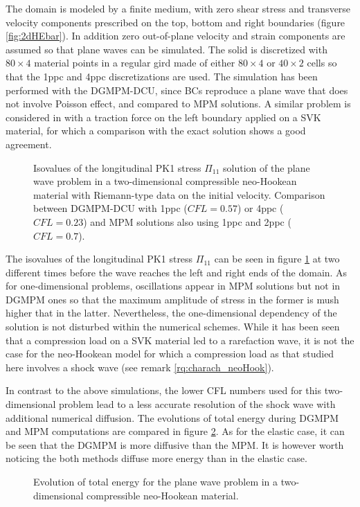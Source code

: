 The domain is modeled by a finite medium, with zero shear stress and transverse velocity components prescribed on the top, bottom and right boundaries (figure \ref{fig:2dHEbar}).
In addition zero out-of-plane velocity and strain components are assumed so that plane waves can be simulated.
The solid is discretized with $80\times 4$ material points in a regular gird made of either $80\times 4$ or $40\times 2$ cells so that the 1ppc and 4ppc discretizations are used.
The simulation has been performed with the DGMPM-DCU, since BCs reproduce a plane wave that does not involve Poisson effect, and compared to MPM solutions. A similar problem is considered in \cite{DGMPM} with a traction force on the left boundary applied on a SVK material, for which a comparison with the exact solution shows a good agreement.
\begin{figure}[h!]
  \centering
  
  \caption{Isovalues of the longitudinal PK1 stress $\Pi_{11}$ solution of the plane wave problem in a two-dimensional compressible neo-Hookean material with Riemann-type data on the initial velocity. Comparison between DGMPM-DCU with 1ppc ($CFL=0.57$) or 4ppc ($CFL=0.23$) and MPM solutions also using 1ppc and 2ppc ($CFL=0.7$).}
  \label{fig:2dplane_Wave}
\end{figure}

The isovalues of the longitudinal PK1 stress $\Pi_{11}$ can be seen in figure \ref{fig:2dplane_Wave} at two different times before the wave reaches the left and right ends of the domain.
As for one-dimensional problems, oscillations appear in MPM solutions but not in DGMPM ones so that the maximum amplitude of stress in the former is mush higher that in the latter.
Nevertheless, the one-dimensional dependency of the solution is not disturbed within the numerical schemes.
While it has been seen that a compression load on a SVK material led to a rarefaction wave, it is not the case for the neo-Hookean model for which a compression load as that studied here involves a shock wave (see remark \ref{rq:charach_neoHook}).

In contrast to the above simulations, the lower CFL numbers used for this two-dimensional problem lead to a less accurate resolution of the shock wave with additional numerical diffusion.
The evolutions of total energy during DGMPM and MPM computations are compared in figure \ref{fig:pw_energy}. As for the elastic case, it can be seen that the DGMPM is more diffusive than the MPM. It is however worth noticing the both methods diffuse more energy than in the elastic case. 
\begin{figure}[h!]
  \centering
  
  \caption{Evolution of total energy for the plane wave problem in a two-dimensional compressible neo-Hookean material.}
  \label{fig:pw_energy}
\end{figure}

